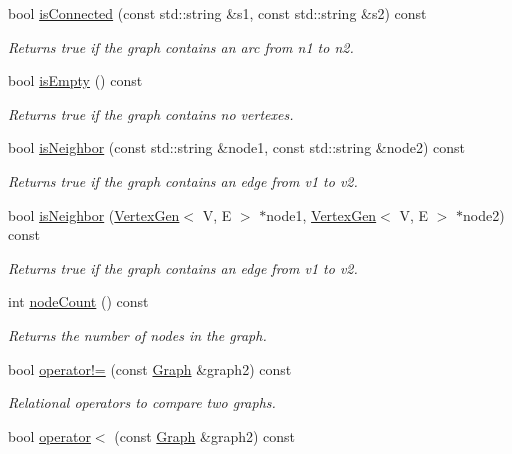 \begin{DoxyCompactItemize}
bool \mbox{\hyperlink{classGraph_a3623b7decbedc522041c2c39d3b14421}{is\+Connected}} (const std\+::string \&s1, const std\+::string \&s2) const
\begin{DoxyCompactList}\small\item\em Returns {\ttfamily true} if the graph contains an arc from {\ttfamily n1} to {\ttfamily n2}. \end{DoxyCompactList}\item 
bool \mbox{\hyperlink{classGraph_acf82f9b2937375c7b1cf3dccb3df3312}{is\+Empty}} () const
\begin{DoxyCompactList}\small\item\em Returns {\ttfamily true} if the graph contains no vertexes. \end{DoxyCompactList}\item 
bool \mbox{\hyperlink{classGraph_ab160bb64995133f6feb351cb23b031fb}{is\+Neighbor}} (const std\+::string \&node1, const std\+::string \&node2) const
\begin{DoxyCompactList}\small\item\em Returns true if the graph contains an edge from v1 to v2. \end{DoxyCompactList}\item 
bool \mbox{\hyperlink{classGraph_a9e752628a118c4a06a538067c95bbb28}{is\+Neighbor}} (\mbox{\hyperlink{classVertexGen}{Vertex\+Gen}}$<$ V, E $>$ $\ast$node1, \mbox{\hyperlink{classVertexGen}{Vertex\+Gen}}$<$ V, E $>$ $\ast$node2) const
\begin{DoxyCompactList}\small\item\em Returns true if the graph contains an edge from v1 to v2. \end{DoxyCompactList}\item 
int \mbox{\hyperlink{classGraph_a5dd1afdb4e1c75fbe51976bf6f70c922}{node\+Count}} () const
\begin{DoxyCompactList}\small\item\em Returns the number of nodes in the graph. \end{DoxyCompactList}\item 
bool \mbox{\hyperlink{classGraph_aafd8d1cec3a4d6b8cdcb58016e4d093a}{operator!=}} (const \mbox{\hyperlink{classGraph}{Graph}} \&graph2) const
\begin{DoxyCompactList}\small\item\em Relational operators to compare two graphs. \end{DoxyCompactList}\item 
bool \mbox{\hyperlink{classGraph_a1daf423faecc777e29a399812dc39ca2}{operator$<$}} (const \mbox{\hyperlink{classGraph}{Graph}} \&graph2) const

\end{DoxyCompactItemize}
